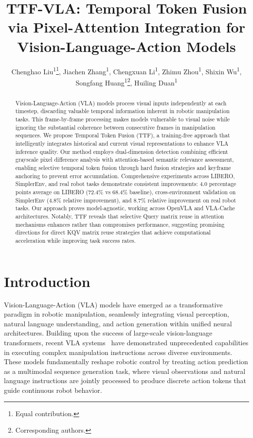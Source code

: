 \documentclass[letterpaper]{article}
\title{TTF-VLA: Temporal Token Fusion via Pixel-Attention Integration for Vision-Language-Action Models}
\author{
    Chenghao Liu\textsuperscript{\rm 1}\thanks{Equal contribution.},
    Jiachen Zhang\textsuperscript{\rm 1}\footnotemark[1],
    Chengxuan Li\textsuperscript{\rm 1}\footnotemark[1],
    Zhimu Zhou\textsuperscript{\rm 1},
    Shixin Wu\textsuperscript{\rm 1},\\
    Songfang Huang\textsuperscript{\rm 1}\thanks{Corresponding authors.},
    Huiling Duan\textsuperscript{\rm 1}\footnotemark[2]
}
\begin{document}
\maketitle

\begin{abstract}
Vision-Language-Action (VLA) models process visual inputs independently at each timestep, discarding valuable temporal information inherent in robotic manipulation tasks. This frame-by-frame processing makes models vulnerable to visual noise while ignoring the substantial coherence between consecutive frames in manipulation sequences. We propose Temporal Token Fusion (TTF), a training-free approach that intelligently integrates historical and current visual representations to enhance VLA inference quality. Our method employs dual-dimension detection combining efficient grayscale pixel difference analysis with attention-based semantic relevance assessment, enabling selective temporal token fusion through hard fusion strategies and keyframe anchoring to prevent error accumulation. Comprehensive experiments across LIBERO, SimplerEnv, and real robot tasks demonstrate consistent improvements: 4.0 percentage points average on LIBERO (72.4\% vs 68.4\% baseline), cross-environment validation on SimplerEnv (4.8\% relative improvement), and 8.7\% relative improvement on real robot tasks. Our approach proves model-agnostic, working across OpenVLA and VLA-Cache architectures. Notably, TTF reveals that selective Query matrix reuse in attention mechanisms enhances rather than compromises performance, suggesting promising directions for direct KQV matrix reuse strategies that achieve computational acceleration while improving task success rates.
\end{abstract}


\begin{links}
\end{links}

\section{Introduction}

Vision-Language-Action (VLA) models have emerged as a transformative paradigm in robotic manipulation, seamlessly integrating visual perception, natural language understanding, and action generation within unified neural architectures. Building upon the success of large-scale vision-language transformers, recent VLA systems~\cite{brohan2022rt1,brohan2023rt2,pertsch2024octo,kim2024openvla,kim2025oft,black2024pi0,black2025pi05} have demonstrated unprecedented capabilities in executing complex manipulation instructions across diverse environments. These models fundamentally reshape robotic control by treating action prediction as a multimodal sequence generation task, where visual observations and natural language instructions are jointly processed to produce discrete action tokens that guide continuous robot behavior.
\end{document}
